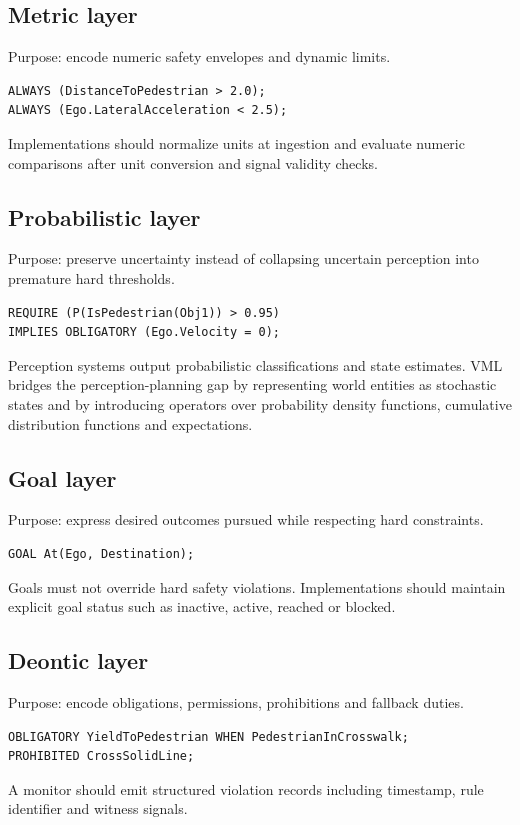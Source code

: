 \documentclass[11pt,a4paper]{article}
\newcommand{\VML}{\textsc{VML}}
\begin{document}
\subsection{Metric layer}
Purpose: encode numeric safety envelopes and dynamic limits.
\begin{verbatim}
ALWAYS (DistanceToPedestrian > 2.0);
ALWAYS (Ego.LateralAcceleration < 2.5);
\end{verbatim}
Implementations should normalize units at ingestion and evaluate numeric comparisons after unit conversion and signal validity checks.

\subsection{Probabilistic layer}
Purpose: preserve uncertainty instead of collapsing uncertain perception into premature hard thresholds.
\begin{verbatim}
REQUIRE (P(IsPedestrian(Obj1)) > 0.95)
IMPLIES OBLIGATORY (Ego.Velocity = 0);
\end{verbatim}
Perception systems output probabilistic classifications and state estimates. \VML{} bridges the perception-planning gap by representing world entities as stochastic states and by introducing operators over probability density functions, cumulative distribution functions and expectations.

\subsection{Goal layer}
Purpose: express desired outcomes pursued while respecting hard constraints.
\begin{verbatim}
GOAL At(Ego, Destination);
\end{verbatim}
Goals must not override hard safety violations. Implementations should maintain explicit goal status such as inactive, active, reached or blocked.

\subsection{Deontic layer}
Purpose: encode obligations, permissions, prohibitions and fallback duties.
\begin{verbatim}
OBLIGATORY YieldToPedestrian WHEN PedestrianInCrosswalk;
PROHIBITED CrossSolidLine;
\end{verbatim}
A monitor should emit structured violation records including timestamp, rule identifier and witness signals.
\end{document}
